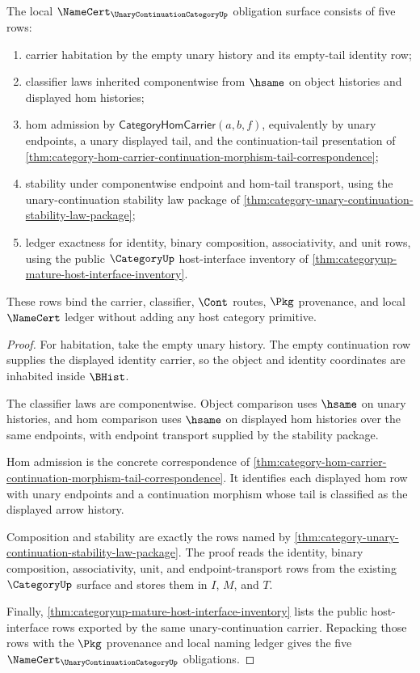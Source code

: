 \begin{theorem}
\label{thm:unary-continuation-category-namecert-obligations}
The local $\NameCert_{\UnaryContinuationCategoryUp}$ obligation surface consists of five rows:
\begin{enumerate}
\item carrier habitation by the empty unary history and its empty-tail identity row;
\item classifier laws inherited componentwise from $\hsame$ on object histories and displayed hom histories;
\item hom admission by $\mathsf{CategoryHomCarrier}(a,b,f)$, equivalently by unary endpoints, a unary displayed tail, and the continuation-tail presentation of \autoref{thm:category-hom-carrier-continuation-morphism-tail-correspondence};
\item stability under componentwise endpoint and hom-tail transport, using the unary-continuation stability law package of \autoref{thm:category-unary-continuation-stability-law-package};
\item ledger exactness for identity, binary composition, associativity, and unit rows, using the public $\CategoryUp$ host-interface inventory of \autoref{thm:categoryup-mature-host-interface-inventory}.
\end{enumerate}
These rows bind the carrier, classifier, $\Cont$ routes, $\Pkg$ provenance, and local $\NameCert$ ledger without adding any host category primitive.
\end{theorem}
\begin{proof}
For habitation, take the empty unary history. The empty continuation row supplies the displayed identity carrier, so the object and identity coordinates are inhabited inside $\BHist$.

The classifier laws are componentwise. Object comparison uses $\hsame$ on unary histories, and hom comparison uses $\hsame$ on displayed hom histories over the same endpoints, with endpoint transport supplied by the stability package.

Hom admission is the concrete correspondence of \autoref{thm:category-hom-carrier-continuation-morphism-tail-correspondence}. It identifies each displayed hom row with unary endpoints and a continuation morphism whose tail is classified as the displayed arrow history.

Composition and stability are exactly the rows named by \autoref{thm:category-unary-continuation-stability-law-package}. The proof reads the identity, binary composition, associativity, unit, and endpoint-transport rows from the existing $\CategoryUp$ surface and stores them in $I$, $M$, and $T$.

Finally, \autoref{thm:categoryup-mature-host-interface-inventory} lists the public host-interface rows exported by the same unary-continuation carrier. Repacking those rows with the $\Pkg$ provenance and local naming ledger gives the five $\NameCert_{\UnaryContinuationCategoryUp}$ obligations.
\end{proof}

